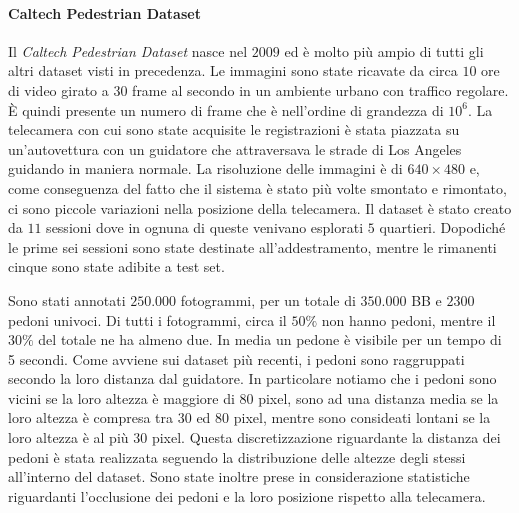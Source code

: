 \paragraph{Caltech Pedestrian Dataset} Il \textit{Caltech Pedestrian Dataset} \cite{dollar2009pedestrian} nasce nel $2009$ ed è molto più ampio di tutti gli altri dataset visti in precedenza. Le immagini sono state ricavate da circa $10$ ore di video girato a $30$ frame al secondo in un ambiente urbano con traffico regolare. È quindi presente un numero di frame che è nell'ordine di grandezza di $10^6$. La telecamera con cui sono state acquisite le registrazioni è stata piazzata su un'autovettura con un guidatore che attraversava le strade di Los Angeles guidando in maniera normale. La risoluzione delle immagini è di $640 \times 480$ e, come conseguenza del fatto che il sistema è stato più volte smontato e rimontato, ci sono piccole variazioni nella posizione della telecamera. Il dataset è stato creato da $11$ sessioni dove in ognuna di queste venivano esplorati $5$ quartieri. Dopodiché le prime sei sessioni sono state destinate all'addestramento, mentre le rimanenti cinque sono state adibite a test set.

Sono stati annotati $250.000$ fotogrammi, per un totale di $350.000$ \ac{BB} e $2300$ pedoni univoci. Di tutti i fotogrammi, circa il $50\%$ non hanno pedoni, mentre il $30\%$ del totale ne ha almeno due. In media un pedone è visibile per un tempo di 5 secondi. Come avviene sui dataset più recenti, i pedoni sono raggruppati secondo la loro distanza dal guidatore. In particolare notiamo che i pedoni sono vicini se la loro altezza è maggiore di $80$ pixel, sono ad una distanza media se la loro altezza è compresa tra $30$ ed $80$ pixel, mentre sono consideati lontani se la loro altezza è al più $30$ pixel. Questa discretizzazione riguardante la distanza dei pedoni è stata realizzata seguendo la distribuzione delle altezze degli stessi all'interno del dataset. Sono state inoltre prese in considerazione statistiche riguardanti l'occlusione dei pedoni e la loro posizione rispetto alla telecamera.



